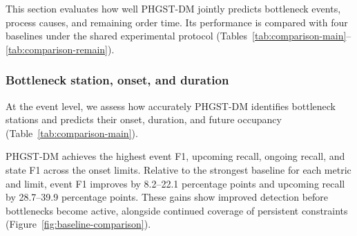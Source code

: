 \documentclass[a4paper,fleqn]{cas-dc}
\begin{document}
This section evaluates how well PHGST-DM jointly predicts bottleneck events, process causes, and remaining order time. Its performance is compared with four baselines under the shared experimental protocol (Tables~\ref{tab:comparison-main}--\ref{tab:comparison-remain}).

\subsubsection{Bottleneck station, onset, and duration}\label{sec:comparison-event}

At the event level, we assess how accurately PHGST-DM identifies bottleneck stations and predicts their onset, duration, and future occupancy (Table~\ref{tab:comparison-main}).

PHGST-DM achieves the highest event F1, upcoming recall, ongoing recall, and state F1 across the onset limits. Relative to the strongest baseline for each metric and limit, event F1 improves by 8.2--22.1 percentage points and upcoming recall by 28.7--39.9 percentage points. These gains show improved detection before bottlenecks become active, alongside continued coverage of persistent constraints (Figure~\ref{fig:baseline-comparison}).
\end{document}
